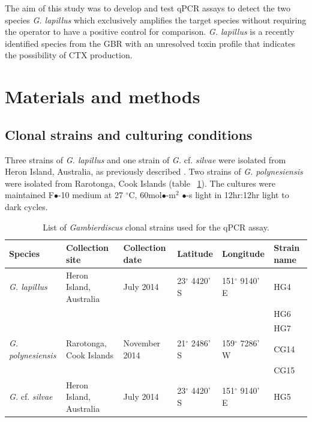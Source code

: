 \documentclass[12pt]{article}
\begin{document}
The aim of this study was to develop and test qPCR assays to detect the two species \emph{G. lapillus} %
which exclusively amplifies the target species without requiring the operator to have a positive control for comparison. 
\emph{G. lapillus} is a recently identified species from the GBR with an unresolved toxin profile that indicates the possibility of CTX production.
\newpage
\section*{Materials and methods}
\subsection*{Clonal strains and culturing conditions}
\FloatBarrier
Three strains of \emph{G. lapillus} and one strain of \emph{G.} cf. \emph{silvae} were isolated from Heron Island, Australia, as previously described \citep{kretzschmar2017characterization}. 
Two strains of \emph{G. polynesiensis} were isolated from Rarotonga, Cook Islands (table ~\ref{tbl:StrainTable}). 
The cultures were maintained F$\bullet$-10 medium at 27 $^{\circ}$C, 60mol$\bullet$-m$^{2}$ $\bullet$-s light in 12hr:12hr light to dark cycles.
\begin{table}
\caption{List of \emph{Gambierdiscus} clonal strains used for the qPCR assay.}
\label{tbl:StrainTable}
\begin{tabular}{ | p{2cm} | p{2cm} | p{2cm}| p{3cm} | p{3cm} | p{2cm} | }
\hline
\textbf{Species} & \textbf{Collection site} & \textbf{Collection date} &\textbf{Latitude} & \textbf{Longitude} & \textbf{Strain name} \\
\hline
\emph{G. lapillus} &Heron Island, Australia &July 2014 &23$^{\circ}$ 4420' S&151$^{\circ}$ 9140' E & HG4 \\
\hline
&&&&& HG6\\
\hline
&&&& &HG7\\
\hline
\emph{G. polynesiensis}&Rarotonga, Cook Islands&November 2014 &21$^{\circ}$ 2486' S&159$^{\circ}$ 7286' W & CG14 \\
\hline
&&&&&CG15\\
\hline
\emph{G.} cf. \emph{silvae}&Heron Island, Australia &July 2014 &23$^{\circ}$ 4420' S&151$^{\circ}$ 9140' E& HG5\\
\hline
\end{tabular}
\end{table}
\FloatBarrier
\end{document}

